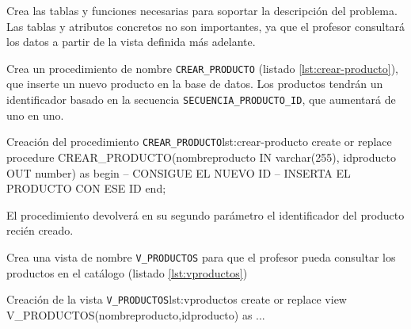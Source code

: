 \begin{homeworkProblem}
  Crea las tablas y funciones necesarias para soportar la descripción del problema. Las tablas y atributos concretos no son importantes, ya que el profesor consultará los datos a partir de la vista definida más adelante.
\end{homeworkProblem}

\begin{homeworkProblem}
  Crea un procedimiento de nombre \texttt{CREAR\_PRODUCTO} (listado \ref{lst:crear-producto}), que inserte un nuevo producto en la base de datos.  Los productos tendrán un identificador basado en la secuencia \texttt{SECUENCIA\_PRODUCTO\_ID}, que aumentará de uno en uno. 

  \begin{listadosql}{Creación del procedimiento \texttt{CREAR\_PRODUCTO}}{lst:crear-producto}
create or replace procedure CREAR_PRODUCTO(nombreproducto IN varchar(255), idproducto OUT number)
as 
begin
  -- CONSIGUE EL NUEVO ID 
  -- INSERTA EL PRODUCTO CON ESE ID
end;
\end{listadosql}

  El procedimiento devolverá en su segundo parámetro el identificador del producto recién creado.

  Crea una vista de nombre \texttt{V\_PRODUCTOS} para que el profesor pueda consultar los productos en el catálogo (listado \ref{lst:vproductos})
  
  \begin{listadosql}{Creación de la vista \texttt{V\_PRODUCTOS}}{lst:vproductos}
  create or replace view V_PRODUCTOS(nombreproducto,idproducto) as
  ...
  \end{listadosql}


  
\end{homeworkProblem}

